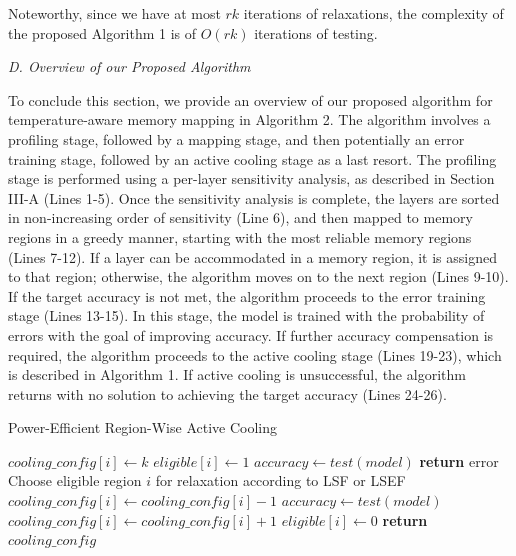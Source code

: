 \documentclass[sigconf]{acmart}
\begin{document}
Noteworthy, since we have at most \( rk \) iterations of relaxations, the complexity of the proposed Algorithm 1 is of \( O(rk) \) iterations of testing.

\textit{D. Overview of our Proposed Algorithm}

To conclude this section, we provide an overview of our proposed algorithm for temperature-aware memory mapping in Algorithm 2. The algorithm involves a profiling stage, followed by a mapping stage, and then potentially an error training stage, followed by an active cooling stage as a last resort. The profiling stage is performed using a per-layer sensitivity analysis, as described in Section III-A (Lines 1-5). Once the sensitivity analysis is complete, the layers are sorted in non-increasing order of sensitivity (Line 6), and then mapped to memory regions in a greedy manner, starting with the most reliable memory regions (Lines 7-12). If a layer can be accommodated in a memory region, it is assigned to that region; otherwise, the algorithm moves on to the next region (Lines 9-10). If the target accuracy is not met, the algorithm proceeds to the error training stage (Lines 13-15). In this stage, the model is trained with the probability of errors with the goal of improving accuracy. If further accuracy compensation is required, the algorithm proceeds to the active cooling stage (Lines 19-23), which is described in Algorithm 1. If active cooling is unsuccessful, the algorithm returns with no solution to achieving the target accuracy (Lines 24-26).

\begin{algorithm}[t]
\caption{Power-Efficient Region-Wise Active Cooling}
\begin{algorithmic}[1]
        \State $cooling\_config[i] \gets k$
        \State $eligible[i] \gets 1$
    \EndFor
    \State $accuracy \gets test(model)$
        \State \textbf{return} error
    \EndIf
    \Repeat
        \State Choose eligible region $i$ for relaxation according to LSF or LSEF
        \State $cooling\_config[i] \gets cooling\_config[i] - 1$
        \State $accuracy \gets test(model)$
            \State $cooling\_config[i] \gets cooling\_config[i] + 1$
            \State $eligible[i] \gets 0$
        \EndIf
    \State \textbf{return} $cooling\_config$
\EndProcedure
\end{algorithmic}
\end{algorithm}
\end{document}
